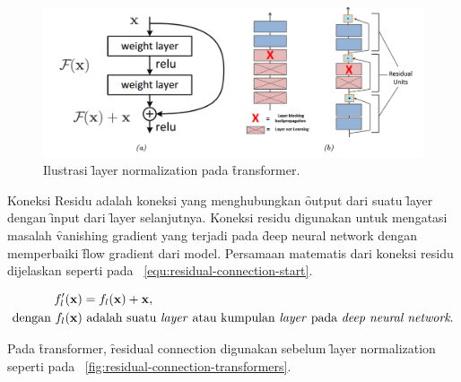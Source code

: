 		\begin{figure}
			\centering
			\includegraphics[width=1\textwidth]{assets/pics/residual-connection.png}
			\caption{Ilustrasi \f{layer normalization} pada \f{transformer}.}
			\label{fig:residual-connection}
		\end{figure}
	

	Koneksi Residu adalah koneksi yang menghubungkan \f{output} dari suatu \f{layer} dengan \f{input} dari \f{layer} selanjutnya. Koneksi residu digunakan untuk mengatasi masalah \f{vanishing gradient} yang terjadi pada \f{deep neural network} dengan memperbaiki \f{flow gradient} dari model. Persamaan matematis dari koneksi residu dijelaskan seperti pada \equ~\ref{equ:residual-connection-start}.

	\begin{align}
		\label{equ:residual-connection-start}
		f_l'(\mathbf{x}) &= f_l(\mathbf{x}) + \mathbf{x}, \\
		\text{dengan } f_l(\mathbf{x}) &\text{ adalah suatu \textit{layer} atau kumpulan \textit{layer} pada \textit{deep neural network}.}
	\end{align}

	Pada \f{transformer}, \f{residual connection} digunakan sebelum \f{layer normalization} seperti pada \pic~\ref{fig:residual-connection-transformers}.

